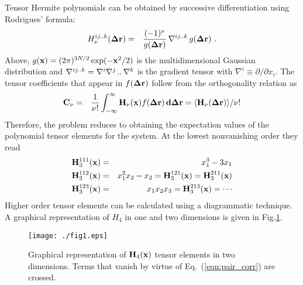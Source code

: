 \documentclass[12pt,article]{iopart}
\begin{document}
Tensor Hermite polynomials can be
obtained by successive differentiation using Rodrigues' formula:
\begin{eqnarray}
\label{Rodrigues}
H_{\nu}^{ij..k}({\bf \Delta r}) &=& \frac{(-1)^\nu}{g({\bf
    \Delta r})}\,{\bf\nabla}^{ij..k}\,g({\bf \Delta r})\ .
\end{eqnarray}
Above, $g({\bf x}) = (2\pi)^{3N/2}\exp(-{\bf x}^2/2)$ is the
multidimen{\-}sional Gaussian distribution and ${\bf \nabla}^{ij..k} =
\nabla^i\nabla^j\,..\,\nabla^k$ is the gradient tensor with
$\nabla^i \equiv \partial/\partial x_i$.
The tensor coefficients that appear in $f({\bf \Delta r})$
follow from the orthogonality relation as
\begin{eqnarray} 
\label{coefs}
{\bf C}_\nu &=& \frac{1}{\nu!}\int_{-\infty}^{\infty} {\bf H}_\nu({\bf x})
f({\bf\Delta r})\, {\bf d\Delta r} =  \langle {\bf H}_\nu({\bf\Delta r})\rangle/\nu!
\label{eqn:orthogonality}
\end{eqnarray}
Therefore, the problem reduces to obtaining the expectation values of
the polynomial tensor elements for the system. At the lowest
nonvanishing order they read
\begin{eqnarray}
\label{H3}
{\bf H}_3^{111}({\bf x}) &=& x_1^3 -3x_1 \nonumber \\
{\bf H}_3^{112}({\bf x}) &=& x_1^2x_2 -x_2 = {\bf H}_3^{121}({\bf x}) = {\bf
  H}_3^{211}({\bf x}) \nonumber \\
{\bf H}_3^{123}({\bf x}) &=& x_1x_2x_3 = {\bf H}_3^{213}({\bf x}) = \cdots
\end{eqnarray}
Higher order tensor elements can be calculated using a diagrammatic technique.
A graphical representation of $H_4$ in one and two dimensions is given in Fig.\ref{Fig1}. 
\begin{figure}[h!]
  \begin{center}
    \texttt{[image: ./fig1.eps]}
  \end{center}
\caption{Graphical representation of ${\bf H}_4({\bf x})$ tensor elements in two
dimensions. Terms that vanish by virtue of Eq.~(\ref{eqn:pair_corr})
are crossed.}
\label{Fig1}
\end{figure}
\end{document}
